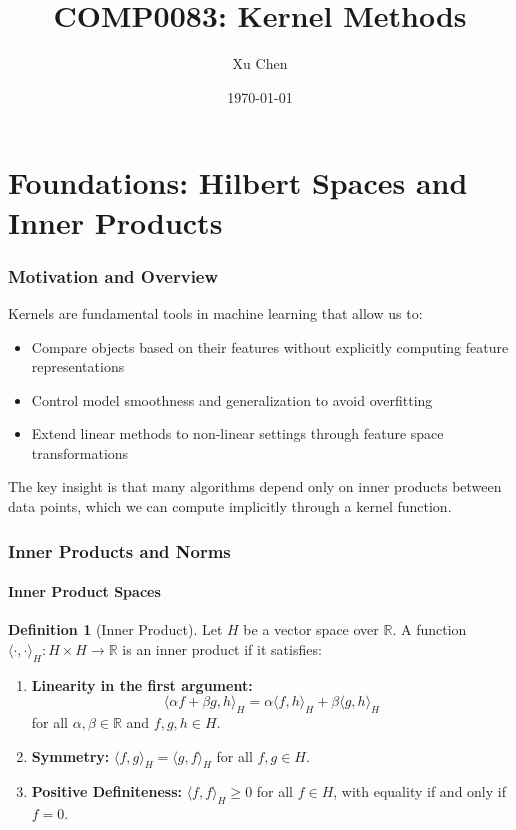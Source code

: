 \documentclass[12pt,a4paper]{article}
\title{COMP0083: Kernel Methods}
\author{Xu Chen}
\date{\today}
\theoremstyle{definition}
\newtheorem{definition}{Definition}[section]
\begin{document}
\maketitle
\tableofcontents
\newpage

\part{Foundations: Hilbert Spaces and Inner Products}

\section{Motivation and Overview}

Kernels are fundamental tools in machine learning that allow us to:
\begin{itemize}
    \item Compare objects based on their features without explicitly computing feature representations
    \item Control model smoothness and generalization to avoid overfitting
    \item Extend linear methods to non-linear settings through feature space transformations
\end{itemize}

The key insight is that many algorithms depend only on inner products between data points, which we can compute implicitly through a kernel function.

\section{Inner Products and Norms}

\subsection{Inner Product Spaces}

\begin{definition}[Inner Product]
Let $H$ be a vector space over $\mathbb{R}$. A function $\langle \cdot, \cdot \rangle_H : H \times H \to \mathbb{R}$ is an inner product if it satisfies:

\begin{enumerate}
    \item \textbf{Linearity in the first argument:} 
    \[
    \langle \alpha f + \beta g, h \rangle_H = \alpha \langle f, h \rangle_H + \beta \langle g, h \rangle_H
    \]
    for all $\alpha, \beta \in \mathbb{R}$ and $f, g, h \in H$.
    
    \item \textbf{Symmetry:} $\langle f, g \rangle_H = \langle g, f \rangle_H$ for all $f, g \in H$.
    
    \item \textbf{Positive Definiteness:} $\langle f, f \rangle_H \geq 0$ for all $f \in H$, with equality if and only if $f = 0$.
\end{enumerate}
\end{definition}
\end{document}
